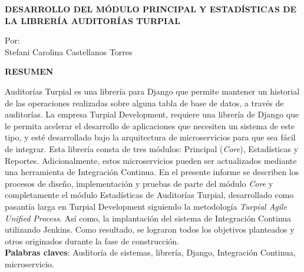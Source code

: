 \begin{center}
    \vspace{2cm}
    \textbf{
    DESARROLLO DEL MÓDULO PRINCIPAL Y ESTADÍSTICAS DE LA LIBRERÍA AUDITORÍAS TURPIAL
    }

    \vspace{2cm}

    Por:\\
    Stefani Carolina Castellanos Torres

    \vspace{2cm}

    \textbf{RESUMEN}\\

    \vspace{2cm}

\end{center}

Auditorías Turpial es una librería para Django que permite mantener un historial de las operaciones realizadas sobre alguna tabla de base de datos, a través de auditorías. La empresa Turpial Development, requiere una librería de Django que le permita acelerar el desarrollo de aplicaciones que necesiten un sistema de este tipo, y esté desarrollado bajo la arquitectura de microservicios para que sea fácil de integrar. Esta librería consta de tres módulos: Principal (\textit{Core}), Estadísticas y Reportes. Adicionalmente, estos microservicios pueden ser actualizados mediante una herramienta de Integración Continua. En el presente informe se describen los procesos de diseño, implementación y pruebas de parte del módulo \textit{Core} y completamente el módulo Estadísticas de Auditorías Turpial, desarrollado como pasantía larga en Turpial Development siguiendo la metodología \textit{Turpial Agile Unified Process}. Así como, la implantación del sistema de Integración Continua utilizando Jenkins. Como resultado, se lograron todos los objetivos planteados y otros originados durante la fase de construcción. \\

    \textbf{Palabras claves}: Auditoría de sistemas, librería, Django, Integración Continua, microservicio.
